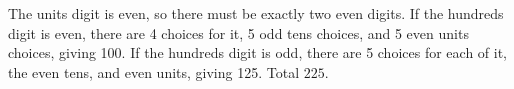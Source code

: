 The units digit is even, so there must be exactly two even digits. If the hundreds digit is even, there are 4 choices for it, 5 odd tens choices, and 5 even units choices, giving 100. If the hundreds digit is odd, there are 5 choices for each of it, the even tens, and even units, giving 125. Total $\boxed{225}$.
